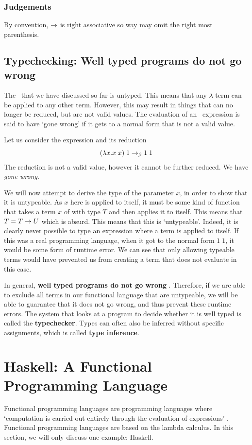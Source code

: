 \subsubsection{Judgements}

By convention, $\rightarrow$ is right associative so way may omit the right most parenthesis. 

\subsection{Typechecking: Well typed programs do not go wrong}
The \lcalc\ that we have discussed so far is untyped. This means that any $\lambda$ term can be applied to any other term. However, this may result in things that can no longer be reduced, but are not valid values. The evaluation of an \lcalc\ expression is said to have `gone wrong' if it gets to a normal form that is not a valid value.

Let us consider the expression and its reduction
\[
(\lambda x. x\;x) \;1 \rightarrow_\beta 1\;1
\]
\noindent The reduction is not a valid value, however it cannot be further reduced. We have \textit{gone wrong}.

We will now attempt to derive the type of the parameter $x$, in order to show that it is untypeable.
As $x$ here is applied to itself, it must be some kind of function that takes a term $x$ of with type $T$ and then applies it to itself. This means that $T = T \rightarrow U$ which is absurd. This means that this is `untypeable'. Indeed, it is clearly never possible to type an expression where a term is applied to itself. If this was a real programming language, when it got to the normal form \(1\;1\), it would be some form of runtime error. We can see that only allowing typeable terms would have prevented us from creating a term that does not evaluate in this case. 

In general, \textbf{well typed programs do not go wrong} \cite{MILNER1978348}. Therefore, if we are able to exclude all terms in our functional language that are untypeable, we will be able to guarantee that it does not go wrong, and thus prevent these runtime errors. The system that looks at a program to decide whether it is well typed is called the \textbf{typechecker}. Types can often also be inferred without specific assignments, which is called \textbf{type inference}.

\section{Haskell: A Functional Programming Language}
Functional programming languages are programming languages where `computation is carried out entirely through the evaluation of expressions' \cite{hudak1989conceptionfunctionalprogranning}. Functional programming languages are based on the lambda calculus. In this section, we will only discuss one example: Haskell. 

